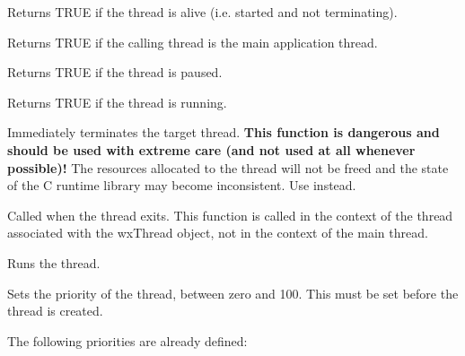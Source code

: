 
Returns TRUE if the thread is alive (i.e. started and not terminating).

\label{wxthreadismain}


Returns TRUE if the calling thread is the main application thread.

\label{wxthreadispaused}


Returns TRUE if the thread is paused.

\label{wxthreadisrunning}


Returns TRUE if the thread is running.

\label{wxthreadkill}


Immediately terminates the target thread. {\bf This function is dangerous and should
be used with extreme care (and not used at all whenever possible)!} The resources
allocated to the thread will not be freed and the state of the C runtime library
may become inconsistent. Use  instead.

\label{wxthreadonexit}


Called when the thread exits. This function is called in the context of the thread
associated with the wxThread object, not in the context of the main thread.

\label{wxthreadrun}


Runs the thread.

\label{wxthreadsetpriority}


Sets the priority of the thread, between zero and 100. This must be set before the thread is created.

The following priorities are already defined:

\twocolwidtha{7cm}
\begin{twocollist}\itemsep=0pt
\end{twocollist}

